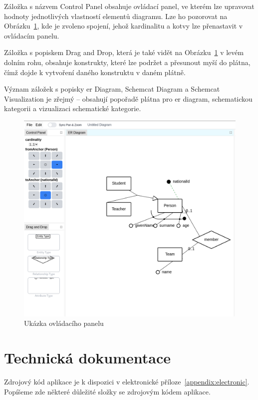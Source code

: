 Záložka s názvem Control Panel obsahuje ovládací panel, ve kterém lze upravovat hodnoty jednotlivých vlastností elementů diagramu.
Lze ho pozorovat na Obrázku~\ref{fig:control-panel}, kde je zvoleno spojení, jehož kardinalitu a kotvy lze přenastavit v ovládacím panelu.

Záložka s popiskem Drag and Drop, která je také vidět na Obrázku~\ref{fig:control-panel} v levém dolním rohu, obsahuje konstrukty, které lze podržet a přesunout myší do plátna, čímž dojde k vytvoření daného konstruktu v daném plátně.

Význam záložek s popisky \acrshort{er} Diagram, Schemcat Diagram a Schemcat Visualization je zřejmý -- obsahují popořadě plátna pro \acrshort{er} diagram, schematickou kategorii a vizualizaci schematické kategorie.

\begin{figure}[!htb]
  \centering
  \includegraphics[width=\maxwidth{\textwidth}]{../img/app/control-panel.png}
  \caption{Ukázka ovládacího panelu}
  \label{fig:control-panel}
\end{figure}

\section{Technická dokumentace}

Zdrojový kód aplikace je k dispozici v elektronické příloze~\ref{appendix:electronic}.
Popíšeme zde některé důležité složky se zdrojovým kódem aplikace.

